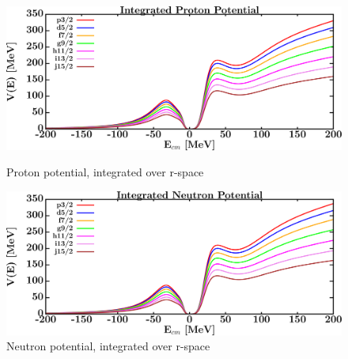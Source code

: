 \begin{figure}[H]
    \centering
    \begin{minipage}{0.45\textwidth}
        \centering
        \includegraphics[width=1.0\textwidth]{figures/o16_protonVolumeIntegrals.png}
        \caption{Proton potential, integrated over r-space}
        \label{DOMFitData_o16_proton_potentialIntegral}
    \end{minipage}\hfill
    \begin{minipage}{0.45\textwidth}
        \centering
        \includegraphics[width=1.0\textwidth]{figures/o16_neutronVolumeIntegrals.png}
        \caption{Neutron potential, integrated over r-space}
        \label{DOMFitData_o16_neutron_potentialIntegral}
    \end{minipage}
\end{figure}

\afterpage{\clearpage}

